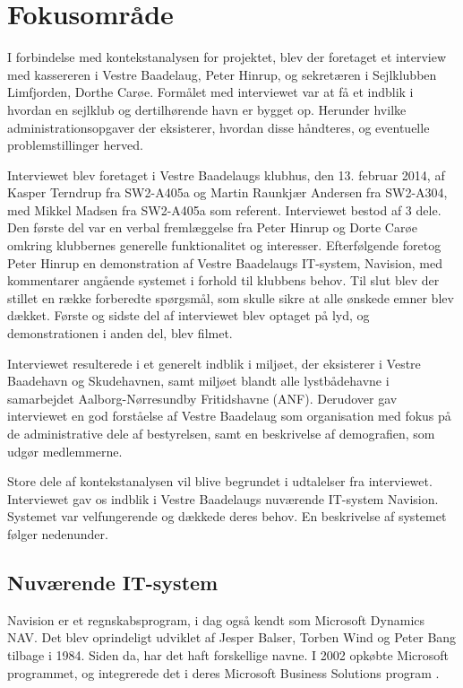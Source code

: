 \section{Fokusområde} %

I forbindelse med kontekstanalysen for projektet, blev der foretaget et interview med kassereren i Vestre Baadelaug, Peter Hinrup, og sekretæren i Sejlklubben Limfjorden, Dorthe Carøe. Formålet med interviewet var at få et indblik i hvordan en sejlklub og dertilhørende havn er bygget op. Herunder hvilke administrationsopgaver der eksisterer, hvordan disse håndteres, og eventuelle problemstillinger herved. 

Interviewet blev foretaget i Vestre Baadelaugs klubhus, den 13. februar 2014, af Kasper Terndrup fra SW2-A405a og Martin Raunkjær Andersen fra SW2-A304, med Mikkel Madsen fra SW2-A405a som referent. Interviewet bestod af 3 dele. Den første del var en verbal fremlæggelse fra Peter Hinrup og Dorte Carøe omkring klubbernes generelle funktionalitet og interesser. Efterfølgende foretog Peter Hinrup en demonstration af Vestre Baadelaugs IT-system, Navision, med kommentarer angående systemet i forhold til klubbens behov. Til slut blev der stillet en række forberedte spørgsmål, som skulle sikre at alle ønskede emner blev dækket. Første og sidste del af interviewet blev optaget på lyd, og demonstrationen i anden del, blev filmet.

Interviewet resulterede i et generelt indblik i miljøet, der eksisterer i Vestre Baadehavn og Skudehavnen, samt miljøet blandt alle lystbådehavne i samarbejdet Aalborg-Nørresundby Fritidshavne (ANF). Derudover gav interviewet en god forståelse af Vestre Baadelaug som organisation med fokus på de administrative dele af bestyrelsen, samt en beskrivelse af demografien, som udgør medlemmerne.

Store dele af kontekstanalysen vil blive begrundet i udtalelser fra interviewet. Interviewet gav os indblik i Vestre Baadelaugs nuværende IT-system Navision. Systemet var velfungerende og dækkede deres behov. En beskrivelse af systemet følger nedenunder. 

\subsection{Nuværende IT-system} %
\label{sub:nuv_it_system}
Navision er et regnskabsprogram, i dag også kendt som Microsoft Dynamics NAV. Det blev oprindeligt udviklet af Jesper Balser, Torben Wind og Peter Bang tilbage i 1984. Siden da, har det haft forskellige navne. I 2002 opkøbte Microsoft programmet, og integrerede det i deres Microsoft Business Solutions program \cite{visiondata}.

